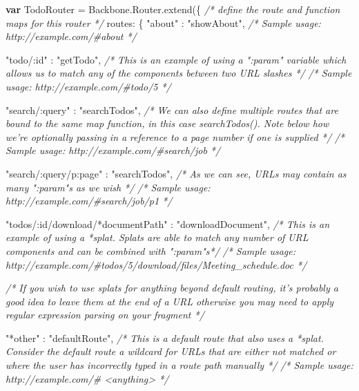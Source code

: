 \documentclass[9pt]{book}
\newenvironment{Shaded}{}{}
\newcommand{\KeywordTok}[1]{\textcolor[rgb]{0.00,0.44,0.13}{\textbf{{#1}}}}
\newcommand{\DataTypeTok}[1]{\textcolor[rgb]{0.56,0.13,0.00}{{#1}}}
\newcommand{\StringTok}[1]{\textcolor[rgb]{0.25,0.44,0.63}{{#1}}}
\newcommand{\CommentTok}[1]{\textcolor[rgb]{0.38,0.63,0.69}{\textit{{#1}}}}
\newcommand{\OtherTok}[1]{\textcolor[rgb]{0.00,0.44,0.13}{{#1}}}
\newcommand{\FunctionTok}[1]{\textcolor[rgb]{0.02,0.16,0.49}{{#1}}}
\newcommand{\NormalTok}[1]{{#1}}
\begin{document}
\begin{Shaded}
\begin{Highlighting}[]
\KeywordTok{var} \NormalTok{TodoRouter = }\OtherTok{Backbone}\NormalTok{.}\OtherTok{Router}\NormalTok{.}\FunctionTok{extend}\NormalTok{(\{}
    \CommentTok{/* define the route and function maps for this router */}
    \DataTypeTok{routes}\NormalTok{: \{}
        \StringTok{"about"} \NormalTok{: }\StringTok{"showAbout"}\NormalTok{,}
        \CommentTok{/* Sample usage: http://example.com/#about */}

        \StringTok{"todo/:id"} \NormalTok{: }\StringTok{"getTodo"}\NormalTok{,}
        \CommentTok{/* This is an example of using a ":param" variable which allows us to match}
\CommentTok{        any of the components between two URL slashes */}
        \CommentTok{/* Sample usage: http://example.com/#todo/5 */}

        \StringTok{"search/:query"} \NormalTok{: }\StringTok{"searchTodos"}\NormalTok{,}
        \CommentTok{/* We can also define multiple routes that are bound to the same map function,}
\CommentTok{        in this case searchTodos(). Note below how we're optionally passing in a}
\CommentTok{        reference to a page number if one is supplied */}
        \CommentTok{/* Sample usage: http://example.com/#search/job */}

        \StringTok{"search/:query/p:page"} \NormalTok{: }\StringTok{"searchTodos"}\NormalTok{,}
        \CommentTok{/* As we can see, URLs may contain as many ":param"s as we wish */}
        \CommentTok{/* Sample usage: http://example.com/#search/job/p1 */}

        \StringTok{"todos/:id/download/*documentPath"} \NormalTok{: }\StringTok{"downloadDocument"}\NormalTok{,}
        \CommentTok{/* This is an example of using a *splat. Splats are able to match any number of}
\CommentTok{        URL components and can be combined with ":param"s*/}
        \CommentTok{/* Sample usage: http://example.com/#todos/5/download/files/Meeting_schedule.doc */}

        \CommentTok{/* If you wish to use splats for anything beyond default routing, it's probably a good}
\CommentTok{        idea to leave them at the end of a URL otherwise you may need to apply regular}
\CommentTok{        expression parsing on your fragment */}

        \StringTok{"*other"}    \NormalTok{: }\StringTok{"defaultRoute"}\NormalTok{,}
        \CommentTok{/* This is a default route that also uses a *splat. Consider the}
\CommentTok{        default route a wildcard for URLs that are either not matched or where}
\CommentTok{        the user has incorrectly typed in a route path manually */}
        \CommentTok{/* Sample usage: http://example.com/# <anything> */}


\end{Highlighting}
\end{Shaded}
\end{document}
